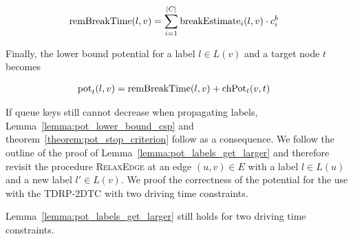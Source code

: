 \begin{align}\label{eq:rem_break_time_n}
	\begin{split}
		\operatorname{remBreakTime}(l,v) & = \sum_{i=1}^{|C|}{\operatorname{breakEstimate}_i(l,v)} \cdot c_i^b
	\end{split}
\end{align}

Finally, the lower bound potential for a label $l \in L(v)$ and a target node $t$ becomes

\begin{align}\label{eq:multiple_breaks_pot}
	\begin{split}
		\operatorname{pot}_t(l,v) & =\operatorname{remBreakTime}(l,v) + \operatorname{chPot}_t(v,t)
	\end{split}
\end{align}

If queue keys still cannot decrease when propagating labels, Lemma~\ref{lemma:pot_lower_bound_csp} and theorem~\ref{theorem:pot_stop_criterion} follow as a consequence. We follow the outline of the proof of Lemma~\ref{lemma:pot_labels_get_larger} and therefore revisit the procedure \textsc{RelaxEdge} at an edge $(u,v) \in E$ with a label $l \in L(u)$ and a new label $l' \in L(v)$. We proof the correctness of the potential for the use with the TDRP-2DTC with two driving time constraints.

\begin{lemma}\label{lemma:pot_labels_get_larger_n}
	Lemma~\ref{lemma:pot_labels_get_larger} still holds for two driving time constraints.
\end{lemma}

